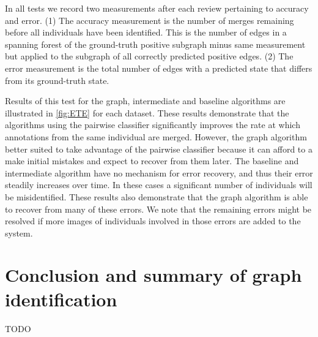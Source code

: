     In all tests we record two measurements after each review pertaining to accuracy and error.
    (1) The accuracy measurement is the number of merges remaining before all individuals have been identified.
    This is the number of edges in a spanning forest of the ground-truth positive subgraph minus same measurement
      but applied to the subgraph of all correctly predicted positive edges.
    (2) The error measurement is the total number of edges with a predicted state that differs from its
      ground-truth state.

    Results of this test for the graph, intermediate and baseline algorithms are illustrated in \cref{fig:ETE}
      for each dataset.
    These results demonstrate that the algorithms using the pairwise classifier significantly improves the rate
      at which annotations from the same individual are merged.
    However, the graph algorithm better suited to take advantage of the pairwise classifier because it can afford
      to a make initial mistakes and expect to recover from them later.
    The baseline and intermediate algorithm have no mechanism for error recovery, and thus their error steadily
      increases over time.
    In these cases a significant number of individuals will be misidentified.
    These results also demonstrate that the graph algorithm is able to recover from many of these errors.
    We note that the remaining errors might be resolved if more images of individuals involved in those errors
      are added to the system.

 
\section{Conclusion and summary of graph identification}\label{sec:graphconclusion}

TODO


